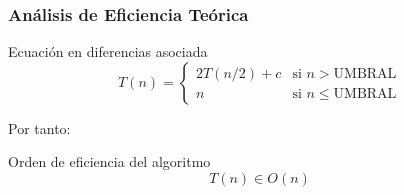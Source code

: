 \documentclass[13pt]{beamer}
\begin{document}
    \begin{frame}
        \frametitle{Análisis de Eficiencia Teórica}

        \begin{block}{Ecuación en diferencias asociada}
            \begin{equation}
                T(n) = \left\{ \begin{array}{lr} 2 T(n/2) + c & \text{si } n > \text{UMBRAL}\\ n & \text{si } n \leqslant \text{UMBRAL} \end{array} \right.
                \label{eq:1b-efi-dyv-rec}
            \end{equation}
        \end{block}

        Por tanto:

        \begin{alertblock}{Orden de eficiencia del algoritmo}
            \begin{equation*}
                \boxed{T(n) \in O(n)}
            \end{equation*}
        \end{alertblock}
        
    \end{frame}
\end{document}
